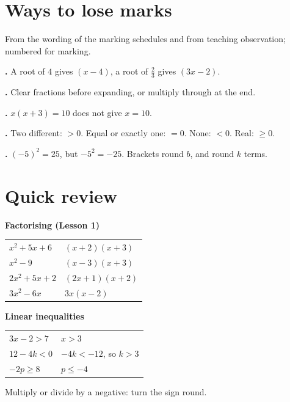 \documentclass[11pt]{article}
\begin{document}
\section{Ways to lose marks}\label{h3:lose}
From the wording of the marking schedules and from teaching observation; numbered for marking.
\begin{description}[leftmargin=10mm, labelwidth=9mm, labelsep=1mm, font=\normalfont]
\item[\textbf{\Lref{rootsign}}] \textbf{.} A root of $4$ gives $(x - 4)$, a root of $\frac{2}{3}$ gives $(3x - 2)$.
\item[\textbf{\Lref{whole}}] \textbf{.} Clear fractions before expanding, or multiply through at the end.
\item[\textbf{\Lref{notzero}}] \textbf{.} $x(x+3) = 10$ does not give $x = 10$.
\item[\textbf{\Lref{disccond}}] \textbf{.} Two different: $>0$. Equal or exactly one: $=0$. None: $<0$. Real: $\geq 0$.
\item[\textbf{\Lref{discbracket}}] \textbf{.} $(-5)^{2} = 25$, but $-5^{2} = -25$. Brackets round $b$, and round $k$ terms.
\end{description}

\section{Quick review}\label{h3:review}
\renewcommand\arraystretch{1.45}
\begin{minipage}[t]{0.47\textwidth}\vspace{0pt}
\textbf{Factorising (Lesson 1)}\par\smallskip
\begin{tabular}{@{}l l@{}}
\toprule
$x^{2} + 5x + 6$ & $(x+2)(x+3)$ \\
$x^{2} - 9$ & $(x-3)(x+3)$ \\
$2x^{2} + 5x + 2$ & $(2x+1)(x+2)$ \\
$3x^{2} - 6x$ & $3x(x-2)$ \\
\bottomrule
\end{tabular}
\end{minipage}\hfill
\begin{minipage}[t]{0.47\textwidth}\vspace{0pt}
\textbf{Linear inequalities}\par\smallskip
\begin{tabular}{@{}l l@{}}
\toprule
$3x - 2 > 7$ & $x > 3$ \\
$12 - 4k < 0$ & $-4k < -12$, so $k > 3$ \\
$-2p \geq 8$ & $p \leq -4$ \\
\bottomrule
\end{tabular}\par\smallskip
Multiply or divide by a negative: turn the sign round.
\end{minipage}
\end{document}
